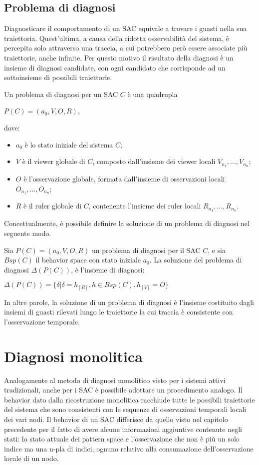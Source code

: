 \subsection{Problema di diagnosi}
Diagnosticare il comportamento di un SAC equivale a trovare i guasti nella sua traiettoria. Quest'ultima, a causa della ridotta osservabilità del sistema, è percepita solo attraverso una traccia, a cui potrebbero però essere associate più traiettorie, anche infinite. Per questo motivo il risultato della diagnosi è un insieme di diagnosi candidate, con ogni candidato che corrisponde ad un sottoinsieme di possibili traiettorie. 
\begin{defn}
Un problema di diagnosi per un SAC $C$ è una quadrupla
\begin{center}
$P(C) = (a_0,V,O,R)$,
\end{center}
dove:
\begin{itemize}
\item $a_0$ è lo stato iniziale del sistema $C$;
\item $V$ è il viewer globale di $C$, composto dall'insieme dei viewer locali $V_{n_1}, \ldots, V_{n_n}$;
\item $O$ è l'osservazione globale, formata dall'insieme di osservazioni locali $O_{n_1}, \ldots, O_{n_n}$;
\item $R$ è il ruler globale di $C$, contenente l'insieme dei ruler locali $R_{n_1}, \ldots, R_{n_n}$.
\end{itemize}
\end{defn}

Concettualmente, è possibile definire la soluzione di un problema di diagnosi nel seguente modo.
\begin{defn}
Sia $P(C) = (a_0,V,O,R)$ un problema di diagnosi per il SAC $C$, e sia $Bsp(C)$ il behavior space con stato iniziale $a_0$. La soluzione del problema di diagnosi $\Delta(P(C))$, è l'insieme di diagnosi:
\begin{center}
	$\Delta(P(C)) = \{ \delta | \delta = h_{[R]}, h \in Bsp(C), h_{[V]} = O\}$
\end{center}
\end{defn}
In altre parole, la soluzione di un problema di diagnosi è l'insieme costituito dagli insiemi di guasti rilevati lungo le traiettorie la cui traccia è consistente con l'osservazione temporale.


\newpage
\section{Diagnosi monolitica}
Analogamente al metodo di diagnosi monolitico visto per i sistemi attivi tradizionali, anche per i SAC è possibile adottare un procedimento analogo. Il behavior dato dalla ricostruzione monolitica racchiude tutte le possibili traiettorie del sistema che sono consistenti con le sequenze di osservazioni temporali locali dei vari nodi.
Il behavior di un SAC differisce da quello visto nel capitolo precedente per il fatto di avere alcune informazioni aggiuntive contenute negli stati: lo stato attuale dei pattern space e l'osservazione che non è più un solo indice ma una n-pla di indici, ognuno relativo alla consumazione dell'osservazione locale di un nodo.

